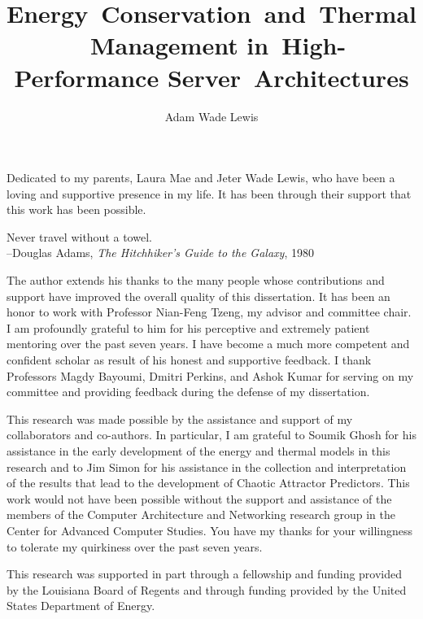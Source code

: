 \documentclass[12pt]{report}	%
\author{Adam Wade Lewis}
\title{Energy~Conservation~and~Thermal~Management in~High-Performance
  Server~Architectures}
\begin{document}
\titlepage              %
\copyrightpage          %
\approvalpage           %

%
%
\begin{dedication}
  Dedicated to my parents, Laura Mae and Jeter Wade Lewis, who have been
  a loving and supportive presence in my life.  It has been through
  their support that this work has been possible.
\end{dedication}

 \begin{epigraph}
 Never travel without a towel.\\
 --Douglas Adams, \emph{The Hitchhiker's Guide to the Galaxy}, 1980
 \end{epigraph}

\begin{acknowledgments}		%
  The author extends his thanks to the many people whose contributions
  and support have improved the overall quality of this dissertation.
  It has been an honor to work with Professor Nian-Feng Tzeng, my
  advisor and committee chair.  I am profoundly grateful to him for his
  perceptive and extremely patient mentoring over the past seven years.
  I have become a much more competent and confident scholar as result of
  his honest and supportive feedback.  I thank Professors Magdy Bayoumi,
  Dmitri Perkins, and Ashok Kumar for serving on my committee and
  providing feedback during the defense of my dissertation.

  This research was made possible by the assistance and support of my
  collaborators and co-authors.  In particular, I am grateful to Soumik
  Ghosh for his assistance in the early development of the energy and
  thermal models in this research and to Jim Simon for his assistance in
  the collection and interpretation of the results that lead to the
  development of Chaotic Attractor Predictors.  This work would not have
  been possible without the support and assistance of the members of the
  Computer Architecture and Networking research group in the Center for
  Advanced Computer Studies.  You have my thanks for your willingness to
  tolerate my quirkiness over the past seven years.

  This research was supported in part through a fellowship and funding
  provided by the Louisiana Board of Regents and through funding
  provided by the United States Department of Energy.

\end{acknowledgments}
\end{document}
